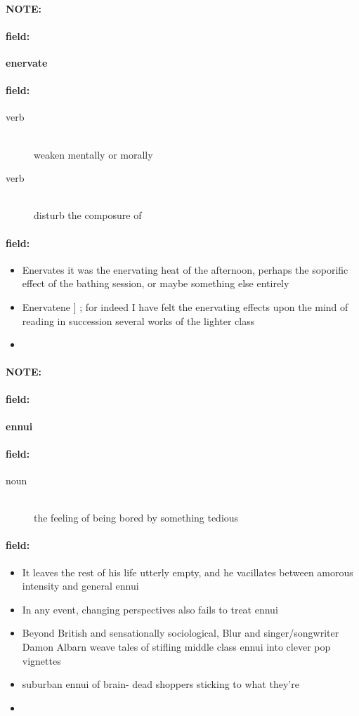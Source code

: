 \documentclass[12pt]{article}
\newenvironment{note}{\paragraph{NOTE:}}{}
\newenvironment{field}{\paragraph{field:}}{}
\begin{document}
\begin{note}
\begin{field}
\textbf{\large enervate}
\end{field}


\begin{field}
\begin{description}
\item[verb] \hfill \\ 
weaken mentally or morally

\item[verb] \hfill \\ 
disturb the composure of

\end{description}
\end{field}

\begin{field}
\begin{itemize}
\item Enervates it was the enervating heat of the afternoon, perhaps the soporific effect of the bathing session, or maybe something else entirely
\item Enervatene ] ; for indeed I have felt the enervating effects upon the mind of reading in succession several works of the lighter class
\item 
\end{itemize}
\end{field}
\end{note}
\begin{note}
\begin{field}
\textbf{\large ennui}
\end{field}


\begin{field}
\begin{description}
\item[noun] \hfill \\ 
the feeling of being bored by something tedious

\end{description}
\end{field}

\begin{field}
\begin{itemize}
\item It leaves the rest of his life utterly empty, and he vacillates between amorous intensity and general ennui
\item In any event, changing perspectives also fails to treat ennui
\item Beyond British and sensationally sociological, Blur and singer/songwriter Damon Albarn weave tales of stifling middle class ennui into clever pop vignettes
\item  suburban ennui of brain- dead shoppers sticking to what they're
\item 
\end{itemize}
\end{field}
\end{note}
\end{document}
